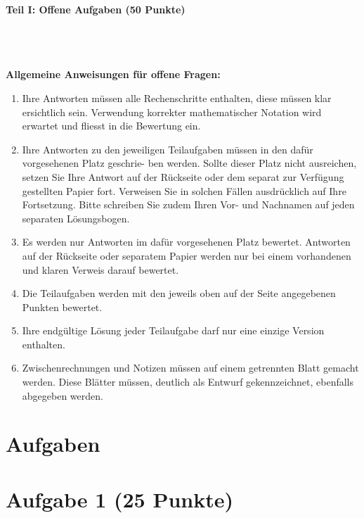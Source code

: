 

\begin{Large}
\textbf{Teil I: Offene Aufgaben (50 Punkte)}
\end{Large}
\\
\\
\\
\textbf{Allgemeine Anweisungen für offene Fragen:}
\\
\renewcommand{\labelenumi}{(\roman{enumi})}
\begin{enumerate}
\item
Ihre Antworten müssen alle Rechenschritte enthalten,
diese müssen klar ersichtlich sein.
Verwendung korrekter mathematischer Notation wird erwartet
und fliesst in die Bewertung ein.

\item
Ihre Antworten zu den jeweiligen Teilaufgaben müssen in den dafür vorgesehenen Platz geschrie-
ben werden. Sollte dieser Platz nicht ausreichen, setzen Sie Ihre Antwort auf der Rückseite oder
dem separat zur Verfügung gestellten Papier fort. Verweisen Sie in solchen Fällen ausdrücklich
auf Ihre Fortsetzung. Bitte schreiben Sie zudem Ihren Vor- und Nachnamen auf jeden separaten
Lösungsbogen.

\item
Es werden nur Antworten im dafür vorgesehenen Platz bewertet. Antworten auf der Rückseite
oder separatem Papier werden nur bei einem vorhandenen und klaren Verweis darauf bewertet.

\item
Die Teilaufgaben werden mit den jeweils oben auf der Seite angegebenen Punkten bewertet.

\item
Ihre endgültige Lösung jeder Teilaufgabe darf nur eine einzige Version enthalten.

\item
Zwischenrechnungen und Notizen müssen auf einem getrennten Blatt gemacht werden. Diese
Blätter müssen, deutlich als Entwurf gekennzeichnet, ebenfalls abgegeben werden.
\end{enumerate}

\newpage
\section*{\hfil Aufgaben \hfil}
\vspace{1cm}
\section*{Aufgabe 1 (25 Punkte)}
\vspace{0.4cm}
